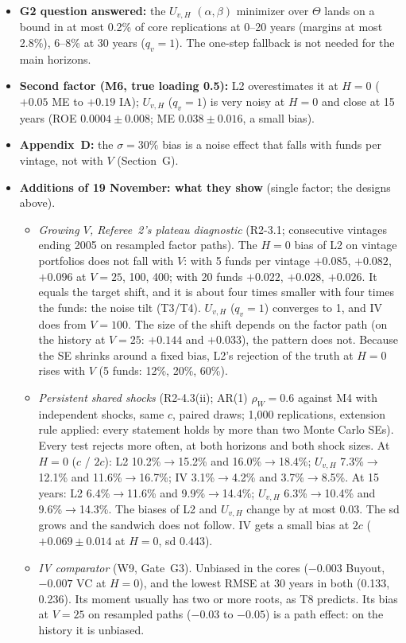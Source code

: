 \documentclass[11pt]{article}
\begin{document}
\begin{itemize}
\item \textbf{G2 question answered:} the $U_{v,H}$ $(\alpha,\beta)$ minimizer over $\Theta$ lands on a bound in at most 0.2\% of core replications at 0--20 years (margins at most 2.8\%), 6--8\% at 30 years ($q_v=1$). The one-step fallback is not needed for the main horizons.
\item \textbf{Second factor (M6, true loading 0.5):} L2 overestimates it at $H=0$ ($+0.05$ ME to $+0.19$ IA); $U_{v,H}$ ($q_v=1$) is very noisy at $H=0$ and close at 15 years (ROE $0.0004\pm0.008$; ME $0.038\pm0.016$, a small bias).
\item \textbf{Appendix~D:} the $\sigma=30\%$ bias is a noise effect that falls with funds per vintage, not with $V$ (Section~G).
\item \textbf{Additions of 19 November: what they show} (single factor; the designs above).
  \begin{itemize}
  \item \emph{Growing $V$, Referee~2's plateau diagnostic} (R2-3.1; consecutive vintages ending 2005 on resampled factor paths). The $H=0$ bias of L2 on vintage portfolios does not fall with $V$: with 5 funds per vintage $+0.085$, $+0.082$, $+0.096$ at $V=25$, 100, 400; with 20 funds $+0.022$, $+0.028$, $+0.026$. It equals the target shift, and it is about four times smaller with four times the funds: the noise tilt (T3/T4). $U_{v,H}$ ($q_v=1$) converges to 1, and IV does from $V=100$. The size of the shift depends on the factor path (on the history at $V=25$: $+0.144$ and $+0.033$), the pattern does not. Because the SE shrinks around a fixed bias, L2's rejection of the truth at $H=0$ rises with $V$ (5 funds: 12\%, 20\%, 60\%).
  \item \emph{Persistent shared shocks} (R2-4.3(ii); AR(1) $\rho_W=0.6$ against M4 with independent shocks, same $c$, paired draws; 1{,}000 replications, extension rule applied: every statement holds by more than two Monte Carlo SEs). Every test rejects more often, at both horizons and both shock sizes. At $H=0$ ($c$ / $2c$): L2 10.2\%$\to$15.2\% and 16.0\%$\to$18.4\%; $U_{v,H}$ 7.3\%$\to$12.1\% and 11.6\%$\to$16.7\%; IV 3.1\%$\to$4.2\% and 3.7\%$\to$8.5\%. At 15 years: L2 6.4\%$\to$11.6\% and 9.9\%$\to$14.4\%; $U_{v,H}$ 6.3\%$\to$10.4\% and 9.6\%$\to$14.3\%. The biases of L2 and $U_{v,H}$ change by at most 0.03. The sd grows and the sandwich does not follow. IV gets a small bias at $2c$ ($+0.069\pm0.014$ at $H=0$, sd 0.443).
  \item \emph{IV comparator} (W9, Gate~G3). Unbiased in the cores ($-0.003$ Buyout, $-0.007$ VC at $H=0$), and the lowest RMSE at 30 years in both (0.133, 0.236). Its moment usually has two or more roots, as T8 predicts. Its bias at $V=25$ on resampled paths ($-0.03$ to $-0.05$) is a path effect: on the history it is unbiased.

\end{itemize}
\end{itemize}
\end{document}
